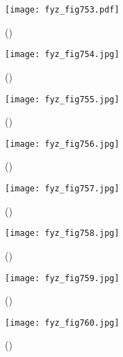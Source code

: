     \begin{figure}[ht!] %
      \centering
      \texttt{[image: fyz\_fig753.pdf]}
      \caption{
               (\cite[s.~707]{Feynman02})}
      \label{fyz:fig753}
    \end{figure}



    \begin{figure}[ht!] %
      \centering
      \texttt{[image: fyz\_fig754.jpg]}
      \caption{
               (\cite[s.~707]{Feynman02})}
      \label{fyz:fig754}
    \end{figure}

    \begin{figure}[ht!] %
      \centering
      \texttt{[image: fyz\_fig755.jpg]}
      \caption{
               (\cite[s.~707]{Feynman02})}
      \label{fyz:fig755}
    \end{figure}

    \begin{figure}[ht!] %
      \centering
      \texttt{[image: fyz\_fig756.jpg]}
      \caption{
               (\cite[s.~707]{Feynman02})}
      \label{fyz:fig756}
    \end{figure}

    \begin{figure}[ht!] %
      \centering
      \texttt{[image: fyz\_fig757.jpg]}
      \caption{
               (\cite[s.~707]{Feynman02})}
      \label{fyz:fig757}
    \end{figure}

    \begin{figure}[ht!] %
      \centering
      \texttt{[image: fyz\_fig758.jpg]}
      \caption{
               (\cite[s.~707]{Feynman02})}
      \label{fyz:fig758}
    \end{figure}

    \begin{figure}[ht!] %
      \centering
      \texttt{[image: fyz\_fig759.jpg]}
      \caption{
               (\cite[s.~707]{Feynman02})}
      \label{fyz:fig759}
    \end{figure}
    
    \begin{figure}[ht!] %
      \centering
      \texttt{[image: fyz\_fig760.jpg]}
      \caption{
               (\cite[s.~707]{Feynman02})}
      \label{fyz:fig760}
    \end{figure}

